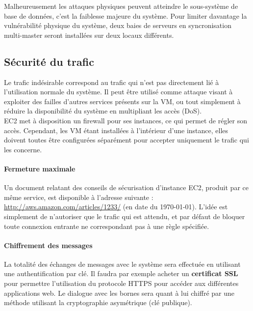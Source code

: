 Malheureusement les attaques physiques peuvent atteindre le sous-système de
base de données, c'est la faiblesse majeure du système. Pour limiter davantage
la vulnérabilité physique du système, deux baies de serveurs en syncronisation
multi-master seront installées sur deux locaux différents.

\subsection{Sécurité du trafic}
\label{subsec:securite-trafic}

Le trafic indésirable correspond au trafic qui n'est pas directement lié à
l'utilisation normale du système. Il peut être utilisé comme attaque visant à
exploiter des failles d'autres services présents sur la VM, ou tout
simplement à réduire la disponibilité du système en multipliant les
accès (DoS). \\

EC2 met à disposition un firewall pour ses instances, ce qui permet de régler
son accès. Cependant, les VM étant installées à l'intérieur d'une instance,
elles doivent toutes être configurées séparément pour accepter uniquement le
trafic qui les concerne.

\paragraph{Fermeture maximale}

Un document relatant des conseils de sécurisation d'instance EC2, produit par
ce même service, est disponible à l'adresse suivante :
\url{http://aws.amazon.com/articles/1233/} (en date du \today). L'idée est
simplement de n'autoriser que le trafic qui est attendu, et par défaut de
bloquer toute connexion entrante ne correspondant pas à une règle spécifiée.

\paragraph{Chiffrement des messages}

La totalité des échanges de messages avec le système sera effectuée en
utilisant une authentification par clé. Il faudra par exemple acheter un
\textbf{certificat SSL} pour permettre l'utilisation du protocole HTTPS pour
accéder aux différentes applications web. Le dialogue avec les bornes sera
quant à lui chiffré par une méthode utilisant la cryptographie asymétrique (clé
publique).


